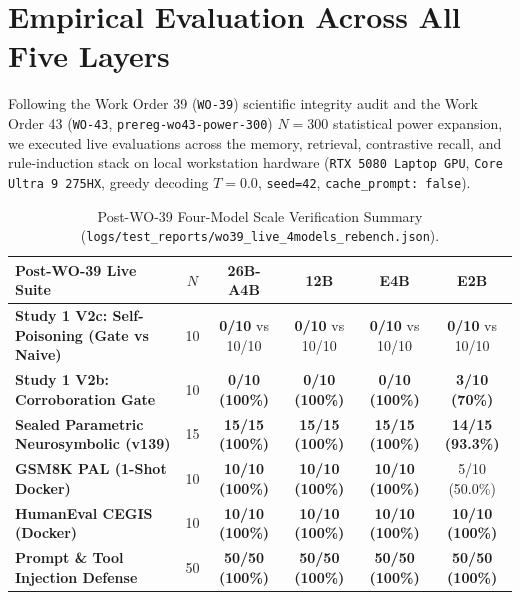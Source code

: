 \documentclass[11pt,a4paper]{article}
\begin{document}
\section{Empirical Evaluation Across All Five Layers}
Following the Work Order 39 (\texttt{WO-39}) scientific integrity audit and the Work Order 43 (\texttt{WO-43}, \texttt{prereg-wo43-power-300}) $N=300$ statistical power expansion, we executed live evaluations across the memory, retrieval, contrastive recall, and rule-induction stack on local workstation hardware (\texttt{RTX 5080 Laptop GPU}, \texttt{Core Ultra 9 275HX}, greedy decoding $T=0.0$, \texttt{seed=42}, \texttt{cache\_prompt: false}).

\begin{table}[h!]
\centering
\small
\begin{tabular}{lccccc}
\toprule
\textbf{Post-WO-39 Live Suite} & $N$ & \textbf{26B-A4B} & \textbf{12B} & \textbf{E4B} & \textbf{E2B} \\
\midrule
\textbf{Study 1 V2c: Self-Poisoning (Gate vs Naive)} & 10 & \textbf{0/10} vs 10/10 & \textbf{0/10} vs 10/10 & \textbf{0/10} vs 10/10 & \textbf{0/10} vs 10/10 \\
\textbf{Study 1 V2b: Corroboration Gate} & 10 & \textbf{0/10 (100\%)} & \textbf{0/10 (100\%)} & \textbf{0/10 (100\%)} & \textbf{3/10 (70\%)} \\
\textbf{Sealed Parametric Neurosymbolic (v139)} & 15 & \textbf{15/15 (100\%)} & \textbf{15/15 (100\%)} & \textbf{15/15 (100\%)} & \textbf{14/15 (93.3\%)} \\
\textbf{GSM8K PAL (1-Shot Docker)} & 10 & \textbf{10/10 (100\%)} & \textbf{10/10 (100\%)} & \textbf{10/10 (100\%)} & 5/10 (50.0\%) \\
\textbf{HumanEval CEGIS (Docker)} & 10 & \textbf{10/10 (100\%)} & \textbf{10/10 (100\%)} & \textbf{10/10 (100\%)} & \textbf{10/10 (100\%)} \\
\textbf{Prompt \& Tool Injection Defense} & 50 & \textbf{50/50 (100\%)} & \textbf{50/50 (100\%)} & \textbf{50/50 (100\%)} & \textbf{50/50 (100\%)} \\
\bottomrule
\end{tabular}
\caption{Post-WO-39 Four-Model Scale Verification Summary (\texttt{logs/test\_reports/wo39\_live\_4models\_rebench.json}).}
\end{table}
\end{document}
